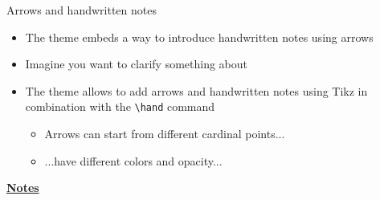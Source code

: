\documentclass[10pt]{beamer}
\begin{document}
\begin{frame}[t]
    {Arrows and handwritten notes}\bigskip
    \begin{itemize}
        \item The theme embeds a way to introduce handwritten notes using arrows \bigskip\medskip
        \item Imagine you want to clarify something about  \bigskip\medskip
        \item The theme allows to add arrows and handwritten notes using Tikz in combination with the \texttt{\textbackslash hand} command \medskip
        \begin{itemize}
            \item Arrows can start from different cardinal points... \medskip
            \item ...have different colors and opacity... \medskip
        \end{itemize}
    \end{itemize}
\end{frame}
\begin{flushleft}
    \underline{\textbf{Notes}}\setlength{\parskip}{.15cm}\notesize\newline\par
\end{flushleft}
\end{document}
